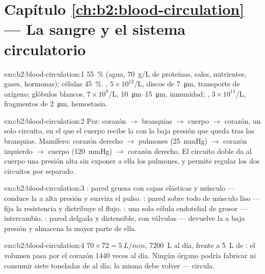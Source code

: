 \section*{Capítulo \ref{ch:b2:blood-circulation} --- La sangre y el sistema circulatorio}

\begin{solution}{exo:b2:blood-circulation:1}
 \qty{55}{\%} (agua, \qty{70}{g/L} de proteínas, sales, nutrientes,
gases, hormonas); células \qty{45}{\%}. , $5\times
10^{12}$/L, discos de \qty{7}{\micro m}, transporte de oxígeno; glóbulos
blancos, $7\times 10^{9}$/L, \qtyrange{10}{15}{\micro m}, inmunidad;
, $3\times 10^{11}$/L, fragmentos de \qty{2}{\micro m},
hemostasia.
\end{solution}

\begin{solution}{exo:b2:blood-circulation:2}
Pez: corazón $\to$ branquias $\to$ cuerpo $\to$ corazón, un solo circuito,
en el que el cuerpo recibe la  con la baja presión que queda tras
las branquias. Mamífero: corazón derecho $\to$ pulmones (\qty{25}{mmHg})
$\to$ corazón izquierdo $\to$ cuerpo
(\qty{120}{mmHg}) $\to$ corazón derecho. El circuito doble da al cuerpo una
presión alta sin exponer a ella los pulmones, y permite regular los dos
circuitos por separado.
\end{solution}

\begin{solution}{exo:b2:blood-circulation:3}
: pared gruesa con capas elásticas y músculo --- conduce la 
a alta presión y suaviza el pulso. : pared sobre todo de músculo
liso --- fija la resistencia y distribuye el flujo. : una sola
célula endotelial de grosor --- intercambio. : pared delgada y
distensible, con válvulas --- devuelve la  a baja presión y almacena
la mayor parte de ella.
\end{solution}

\begin{solution}{exo:b2:blood-circulation:4}
$70\times 72 = \qty{5}{L/min}$, \qty{7200}{L} al día, frente a \qty{5}{L}
de : el volumen pasa por el corazón \num{1440} veces al día. Ningún
órgano podría fabricar ni consumir siete toneladas de  al día; la
misma  debe volver --- circula.
\end{solution}

